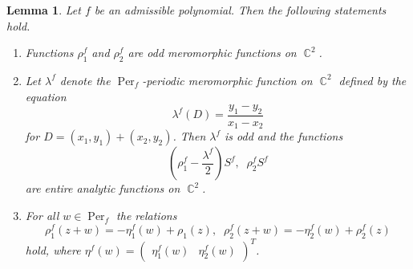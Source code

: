 \documentclass{amsart}
\numberwithin{equation}{section}
\newtheorem{lemma}[theorem]{Lemma}
\theoremstyle{definition}
\theoremstyle{remark}
\DeclareMathOperator{\CC}{\mathbb C}
\DeclareMathOperator{\Per}{Per}
\begin{document}
	\begin{lemma}\label{lemRhoProperties}
		Let $f$ be an admissible polynomial. Then the following statements hold.
		\begin{enumerate}[label=(\roman*)]
			\item\label{Rhoi} Functions $\rho_1^f$ and $\rho_2^f$ are odd meromorphic functions on $\CC^2$.
			\item\label{Rhoii} Let $\lambda^f$ denote the $\Per_f$-periodic meromorphic function on $\CC^2$ defined by the equation 
			\[
			\lambda^f(D) = \frac{y_1 - y_2}{x_1 - x_2}
			\]
			for $D = (x_1,y_1) + (x_2,y_2)$. Then $\lambda^f$ is odd and the functions
			\[
			\left(\rho_1^f - \frac{\lambda^f}{2}\right) S^f,\;\;\rho_2^fS^f
			\]
			are entire analytic functions on $\CC^2$.
			\item\label{Rhoiii} For all $w \in \Per_f$ the relations
			\[
			\rho_1^f(z + w) = -\eta^f_1(w) + \rho_1(z),\;\;\rho_2^f(z + w) = -\eta^f_2(w) + \rho_2^f(z)
			\]
			hold, where $\eta^f(w) = \begin{pmatrix}
				\eta^f_1(w) & \eta^f_2 (w)
			\end{pmatrix}^T$.
		\end{enumerate}
	\end{lemma}
\end{document}
